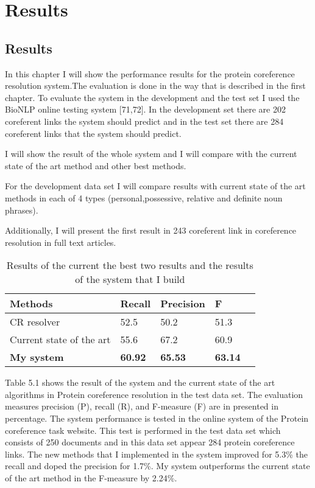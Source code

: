 \chapter{Results}
\label{Results}
\section{Results}

In this chapter I will show the performance results for the protein coreference resolution system.The evaluation is done in the way that is described in the first chapter. To evaluate the system in the development and the test set I used the BioNLP online testing system [71,72]. In the development set there are 202 coreferent links the system should predict and in the test set there are 284 coreferent links that the system should predict.  

I will show the result of the whole system and I will compare with the current state of the art method and other best methods.

For the development data set I will compare results with current state of the art methods in each of 4 types (personal,possessive, relative and definite noun phrases). 

Additionally, I will present the first result in 243 coreferent link in coreference resolution in full text articles.

\begin{table}[h]
\centering
   \begin{center}
	 \begin{tabular}{l | C{1.7cm} C{2cm} C{1.7cm} @{}m{0pt}@{}}
 		
  		Methods & Recall & Precision & F &  \\[1.1ex]
 		\hline
 		CR resolver & 52.5 & 50.2 & 51.3&  \\ [1.1ex]
 		\hline 
 		Current state of the art & 55.6 & 67.2 & 60.9 & \\ [1.1ex]
 		\hline   
 		\textbf{My system} & \textbf{60.92} & \textbf{65.53} & \textbf{63.14}& \\ [1.1ex]
 		\hline  
 	\end{tabular}
  \end{center} 
  \caption{ Results of the current the best two results and the results of the system that I build}
\end{table}
Table 5.1 shows the result of the system and the current state of the art algorithms in Protein coreference resolution in the test data set. The evaluation measures precision (P), recall (R), and F-measure (F)  are in presented in percentage. The system performance is tested in the online system of the Protein coreference task website. This test is performed in the test data set which consists of 250 documents and in this data set appear 284 protein coreference links. The new methods that I implemented in the system improved for 5.3\% the recall and doped the precision for 1.7\%. My system outperforms the current state of the art  method in the F-measure by 2.24\%.

